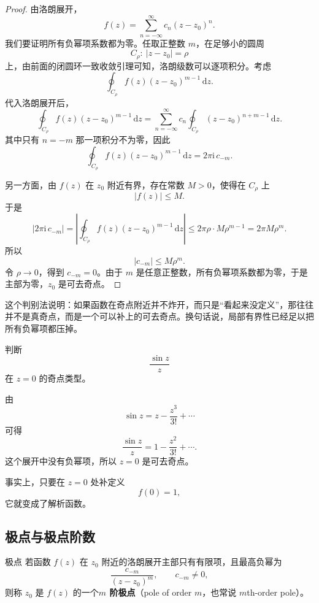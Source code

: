 \begin{proof}
由洛朗展开，
\[
    f(z)=\sum_{n=-\infty}^{\infty} c_n (z-z_0)^n.
\]
我们要证明所有负幂项系数都为零。任取正整数 $m$，在足够小的圆周
\[
    C_\rho:\ |z-z_0|=\rho
\]
上，由前面的闭圆环一致收敛引理可知，洛朗级数可以逐项积分。考虑
\[
\oint_{C_\rho} f(z)(z-z_0)^{m-1}\,\mathrm{d}z.
\]
代入洛朗展开后，
\[
    \oint_{C_\rho} f(z)(z-z_0)^{m-1}\,\mathrm{d}z
    = \sum_{n=-\infty}^{\infty} c_n \oint_{C_\rho}(z-z_0)^{n+m-1}\,\mathrm{d}z.
\]
其中只有 $n=-m$ 那一项积分不为零，因此
\[
    \oint_{C_\rho} f(z)(z-z_0)^{m-1}\,\mathrm{d}z = 2\pi \mathrm{i}\, c_{-m}.
\]

另一方面，由 $f(z)$ 在 $z_0$ 附近有界，存在常数 $M>0$，使得在 $C_\rho$ 上
\[
    |f(z)|\le M.
\]
于是
\[
    |2\pi \mathrm{i}\, c_{-m}|
    = \left|\oint_{C_\rho} f(z)(z-z_0)^{m-1}\,\mathrm{d}z\right|
    \le 2\pi \rho \cdot M \rho^{m-1}
    = 2\pi M \rho^m.
\]
所以
\[
    |c_{-m}| \le M \rho^m.
\]
令 $\rho\to 0$，得到 $c_{-m}=0$。由于 $m$ 是任意正整数，所有负幂项系数都为零，于是主部为零，$z_0$ 是可去奇点。
\end{proof}

\begin{zhu}{}{}
这个判别法说明：如果函数在奇点附近并不炸开，而只是``看起来没定义''，那往往并不是真奇点，而是一个可以补上的可去奇点。换句话说，局部有界性已经足以把所有负幂项都压掉。
\end{zhu}

\begin{lizi}{}{}
判断
\[
    \frac{\sin z}{z}
\]
在 $z=0$ 的奇点类型。

\begin{jie}
由
\[
    \sin z = z-\frac{z^3}{3!}+\cdots
\]
可得
\[
    \frac{\sin z}{z} = 1-\frac{z^2}{3!}+\cdots.
\]
这个展开中没有负幂项，所以 $z=0$ 是可去奇点。

事实上，只要在 $z=0$ 处补定义
\[
    f(0)=1,
\]
它就变成了解析函数。
\end{jie}
\end{lizi}

\subsection{极点与极点阶数}

\begin{dingliyi}{极点}{}
若函数 $f(z)$ 在 $z_0$ 附近的洛朗展开主部只有有限项，且最高负幂为
\[
    \frac{c_{-m}}{(z-z_0)^m},\qquad c_{-m}\ne 0,
\]
则称 $z_0$ 是 $f(z)$ 的一个\textbf{$m$ 阶极点}（pole of order $m$，也常说 $m$th-order pole）。
\end{dingliyi}

